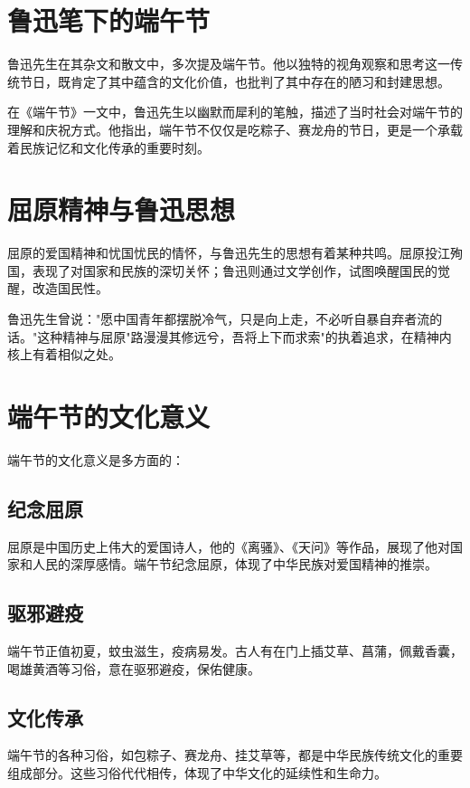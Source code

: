 \documentclass[12pt,a4paper]{article}
\begin{document}
\section{鲁迅笔下的端午节}

鲁迅先生在其杂文和散文中，多次提及端午节。他以独特的视角观察和思考这一传统节日，既肯定了其中蕴含的文化价值，也批判了其中存在的陋习和封建思想。

在《端午节》一文中，鲁迅先生以幽默而犀利的笔触，描述了当时社会对端午节的理解和庆祝方式。他指出，端午节不仅仅是吃粽子、赛龙舟的节日，更是一个承载着民族记忆和文化传承的重要时刻。

\section{屈原精神与鲁迅思想}

屈原的爱国精神和忧国忧民的情怀，与鲁迅先生的思想有着某种共鸣。屈原投江殉国，表现了对国家和民族的深切关怀；鲁迅则通过文学创作，试图唤醒国民的觉醒，改造国民性。

鲁迅先生曾说："愿中国青年都摆脱冷气，只是向上走，不必听自暴自弃者流的话。"这种精神与屈原"路漫漫其修远兮，吾将上下而求索"的执着追求，在精神内核上有着相似之处。

\section{端午节的文化意义}

端午节的文化意义是多方面的：

\subsection{纪念屈原}
屈原是中国历史上伟大的爱国诗人，他的《离骚》、《天问》等作品，展现了他对国家和人民的深厚感情。端午节纪念屈原，体现了中华民族对爱国精神的推崇。

\subsection{驱邪避疫}
端午节正值初夏，蚊虫滋生，疫病易发。古人有在门上插艾草、菖蒲，佩戴香囊，喝雄黄酒等习俗，意在驱邪避疫，保佑健康。

\subsection{文化传承}
端午节的各种习俗，如包粽子、赛龙舟、挂艾草等，都是中华民族传统文化的重要组成部分。这些习俗代代相传，体现了中华文化的延续性和生命力。
\end{document}
